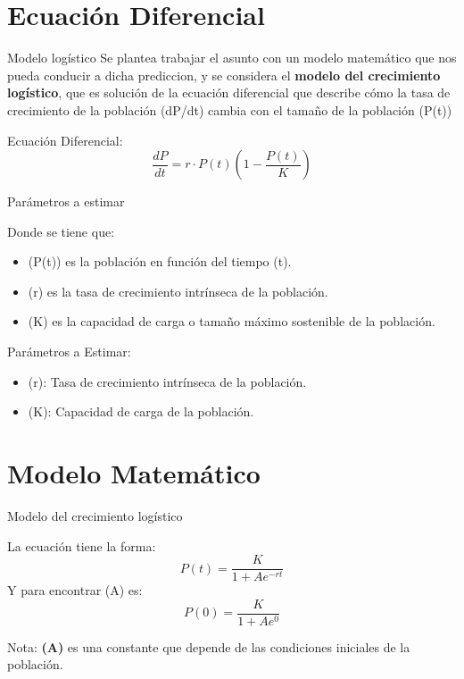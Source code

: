 \documentclass{beamer}
\begin{document}
\section{Ecuación Diferencial}
\begin{frame}{Modelo logístico}
    Se plantea trabajar el asunto con un modelo matemático que nos pueda conducir a dicha prediccion, y se considera 
    el \textbf{modelo del crecimiento logístico}, que es solución de la ecuación diferencial que describe cómo la tasa de crecimiento de la población (dP/dt) 
    cambia con el tamaño de la población (P(t)) 
    \begin{block}{Ecuación Diferencial:}
    $$\frac{dP}{dt} = r \cdot P(t)(1 - \frac{P(t)}{K}) $$
    \end{block}
\end{frame}
\begin{frame}{Parámetros a estimar}
\begin{block}{Donde se tiene que:}
\begin{itemize}
    \item (P(t)) es la población en función del tiempo (t).
    \item (r) es la tasa de crecimiento intrínseca de la población.
    \item (K) es la capacidad de carga o tamaño máximo sostenible de la población.
\end{itemize}
\end{block}

\begin{block}{Parámetros a Estimar:}
\begin{itemize}
    \item (r): Tasa de crecimiento intrínseca de la población. 
    \item (K): Capacidad de carga de la población.
\end{itemize}
\end{block}
\end{frame}

\section{Modelo Matemático}
\begin{frame}{Modelo del crecimiento logístico}
    \begin{block}{La ecuación tiene la forma: }
    $$P(t) = \frac{K}{1 + Ae^{-rt}}$$
    Y para encontrar (A) es:
    $$P(0) = \frac{K}{1 + Ae^{0}}$$
    \end{block}
    Nota: \textbf{(A)} es una constante que depende de las condiciones iniciales de la población.
\end{frame}
\end{document}
